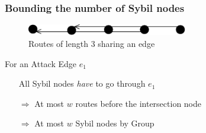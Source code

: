 \documentclass{beamer}
\begin{document}

\begin{frame}

  \frametitle{Bounding the number of Sybil nodes}

  \begin{figure}
    \includegraphics[width=7cm]{./pictures/bound_nodes} 
    \caption{Routes of length 3 sharing an edge}
  \end{figure}
  
  \begin{block}{For an Attack Edge $e_1$}
    \begin{itemize}
      \item[] All Sybil nodes \emph{have} to go through $e_1$
      \item[$\Rightarrow$] At most $w$ routes before the intersection node %
      \item[$\Rightarrow$] At most $w$ Sybil nodes by Group
    \end{itemize}
  \end{block}

\end{frame}

\end{document}
